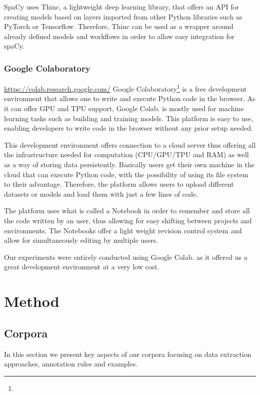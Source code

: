 \documentclass[12pt,a4paper]{report}
\begin{document}
SpaCy uses Thinc, a lightweight deep learning library, that offers an API for creating models based on layers imported from other Python libraries such as PyTorch or Tensorflow. Therefore, Thinc can be used as a wrapper around already defined models and workflows in order to allow easy integration for spaCy.

\subsection{Google Colaboratory}
\urldef{\urlGoogleColab}\url{https://colab.research.google.com/}
Google Colaboratory\footnote{\urlGoogleColab} is a free development environment that allows one to write and execute Python code in the browser. As it can offer GPU and TPU support, Google Colab. is mostly used for machine learning tasks such as building and training models. This platform is easy to use, enabling developers to write code in the browser without any prior setup needed. 

This development environment offers connection to a cloud server thus offering all the infrastructure needed for computation (CPU/GPU/TPU and RAM) as well as a way of storing data persistently. Basically users get their own machine in the cloud that can execute Python code, with the possibility of using its file system to their advantage. Therefore, the platform allows users to upload different datasets or models and load them with just a few lines of code.

The platform uses what is called a Notebook in order to remember and store all the code written by an user, thus allowing for easy shifting between projects and environments. The Notebooks offer a light weight revision control system and allow for simultaneously editing by multiple users.

Our experiments were entirely conducted using Google Colab. as it offered us a great development environment at a very low cost.

\chapter{Method}
\label{chap:method}

\section{Corpora}

In this section we present key aspects of our corpora focusing on data extraction approaches, annotation rules and examples.
\end{document}
